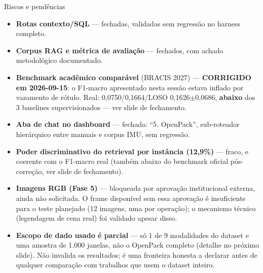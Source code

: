 \documentclass{beamer}
\begin{document}
\begin{frame}{Riscos e pendências}
  \small
  \begin{itemize}
    \item[\textcolor{green!60!black}{\textbullet}] \textbf{Rotas contexto/SQL} — fechadas,
      validadas sem regressão no harness completo.
    \item[\textcolor{green!60!black}{\textbullet}] \textbf{Corpus RAG e métrica de avaliação}
      — fechados, com achado metodológico documentado.
    \item[\textcolor{red!80!black}{\textbullet}] \textbf{Benchmark acadêmico comparável}
      (BRACIS 2027) — \textbf{CORRIGIDO em 2026-09-15}: o F1-macro apresentado nesta sessão
      estava inflado por vazamento de rótulo. Real: 0,0750/0,1664/LOSO 0,1626$\pm$0,0686,
      \textbf{abaixo} dos 3 baselines supervisionados — ver slide de fechamento.
    \item[\textcolor{green!60!black}{\textbullet}] \textbf{Aba de chat no dashboard} — fechada:
      ``5. OpenPack'', sub-roteador hierárquico entre manuais e corpus IMU, sem regressão.
    \item[\textcolor{orange!90!black}{\textbullet}] \textbf{Poder discriminativo do retrieval
      por instância (12,9\%)} — fraco, e coerente com o F1-macro real (também abaixo do
      benchmark oficial pós-correção, ver slide de fechamento).
    \item[\textcolor{red!80!black}{\textbullet}] \textbf{Imagens RGB (Fase 5)} — bloqueada por
      aprovação institucional externa, ainda não solicitada. O frame disponível sem essa
      aprovação é insuficiente para o teste planejado (12 imagens, uma por operação); o
      mecanismo técnico (legendagem de cena real) foi validado apesar disso.
    \item[\textcolor{orange!90!black}{\textbullet}] \textbf{Escopo de dado usado é parcial} —
      só 1 de 9 modalidades do dataset e uma amostra de 1.000 janelas, não o OpenPack completo
      (detalhe no próximo slide). Não invalida os resultados; é uma fronteira honesta a
      declarar antes de qualquer comparação com trabalhos que usem o dataset inteiro.
  \end{itemize}
\end{frame}
\end{document}

